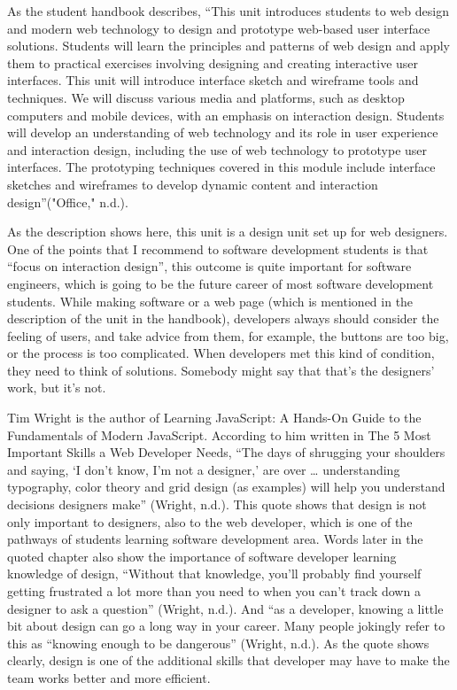 \documentclass[12pt]{article}
\begin{document}
As the student handbook describes, “This unit introduces students to web design and modern web technology to design and prototype web-based user interface solutions. Students will learn the principles and patterns of web design and apply them to practical exercises involving designing and creating interactive user interfaces. This unit will introduce interface sketch and wireframe tools and techniques. We will discuss various media and platforms, such as desktop computers and mobile devices, with an emphasis on interaction design. Students will develop an understanding of web technology and its role in user experience and interaction design, including the use of web technology to prototype user interfaces. The prototyping techniques covered in this module include interface sketches and wireframes to develop dynamic content and interaction design”("Office," n.d.).

As the description shows here, this unit is a design unit set up for web designers. One of the points that I recommend to software development students is that “focus on interaction design”, this outcome is quite important for software engineers, which is going to be the future career of most software development students. While making software or a web page (which is mentioned in the description of the unit in the handbook), developers always should consider the feeling of users, and take advice from them, for example, the buttons are too big, or the process is too complicated. When developers met this kind of condition, they need to think of solutions. Somebody might say that that’s the designers’ work, but it’s not.

Tim Wright is the author of Learning JavaScript: A Hands-On Guide to the Fundamentals of Modern JavaScript. According to him written in The 5 Most Important Skills a Web Developer Needs, “The days of shrugging your shoulders and saying, ‘I don’t know, I’m not a designer,’ are over … understanding typography, color theory and grid design (as examples) will help you understand decisions designers make” (Wright, n.d.). This quote shows that design is not only important to designers, also to the web developer, which is one of the pathways of students learning software development area. Words later in the quoted chapter also show the importance of software developer learning knowledge of design, “Without that knowledge, you’ll probably find yourself getting frustrated a lot more than you need to when you can’t track down a designer to ask a question”  (Wright, n.d.). And “as a developer, knowing a little bit about design can go a long way in your career. Many people jokingly refer to this as “knowing enough to be dangerous”  (Wright, n.d.). As the quote shows clearly, design is one of the additional skills that developer may have to make the team works better and more efficient.
\end{document}
